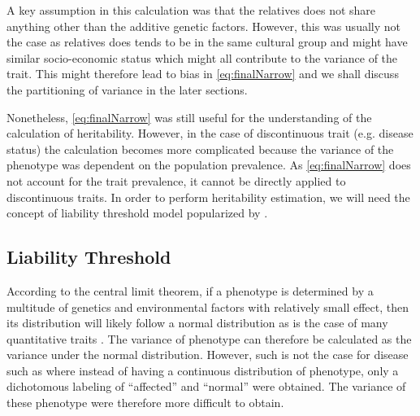	A key assumption in this calculation was that the relatives does not share anything other than the additive genetic factors.
	However, this was usually not the case as relatives does tends to be in the same cultural group and might have similar socio-economic status which might all contribute to the variance of the trait.
	This might therefore lead to bias in \cref{eq:finalNarrow} and we shall discuss the partitioning of variance in the later sections.
	
	Nonetheless, \cref{eq:finalNarrow} was still useful for the understanding of the calculation of heritability.
	However, in the case of discontinuous trait (e.g. disease status) the calculation becomes more complicated because the variance of the phenotype was dependent on the population prevalence.
	As \cref{eq:finalNarrow} does not account for the trait prevalence, it cannot be directly applied to discontinuous traits.
	In order to perform heritability estimation, we will need the concept of liability threshold model popularized by \cite{Falconer1965}.
	
	\subsection{Liability Threshold}
	\label{sec:liability}
	According to the central limit theorem, if a phenotype is determined by a multitude of genetics and environmental factors with relatively small effect, then its distribution will likely follow a normal distribution as is the case of many quantitative traits \citep{Visscher2008}. %
	The variance of phenotype can therefore be calculated as the variance under the normal distribution.
	However, such is not the case for disease such as  where instead of having a continuous distribution of phenotype, only a dichotomous labeling of ``affected'' and ``normal'' were obtained.
	The variance of these phenotype were therefore more difficult to obtain.
	
